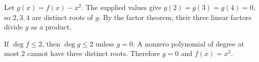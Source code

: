 Let $g(x)=f(x)-x^2$. The supplied values give $g(2)=g(3)=g(4)=0$, so $2,3,4$ are distinct roots of $g$. By the factor theorem, their three linear factors divide $g$ as a product.

If $\deg f\le2$, then $\deg g\le2$ unless $g=0$. A nonzero polynomial of degree at most $2$ cannot have three distinct roots. Therefore $g=0$ and $\boxed{f(x)=x^2}$.
